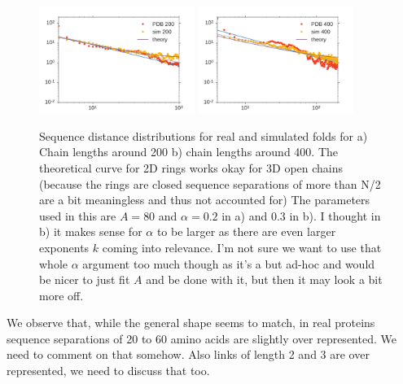 \documentclass[reprint,amsmath,amssymb,rmp,onecolumn,notitlepage,11pt]{revtex4-1}
\newcommand{\red}[1]{\textcolor{red!80!black}{#1}}
\begin{document}
\begin{figure}[h]
        \centering
	\includegraphics[width=0.45\textwidth]{figures/both_200.pdf}
	\includegraphics[width=0.45\textwidth]{figures/both_400.pdf}
        \caption{Sequence distance distributions for real and simulated folds for a) Chain lengths around 200 b) chain lengths around 400. The theoretical curve for 2D rings works okay for 3D open chains (because the rings are closed sequence separations of more than N/2 are a bit meaningless and thus not accounted for) The parameters used in this are $A=80$ and $\alpha=0.2$ in a) and $0.3$ in b). I thought in b) it makes sense for $\alpha$ to be larger as there are even larger exponents $k$ coming into relevance. I'm not sure we want to use that whole $\alpha$ argument too much though as it's a but ad-hoc and would be nicer to just fit $A$ and be done with it, but then it may look a bit more off.
        }
        \label{fig:time_scaling}
\end{figure}
\red{We observe that, while the general shape seems to match, in real proteins sequence separations of 20 to 60 amino acids are slightly over represented. We need to comment on that somehow. Also links of length 2 and 3 are over represented, we need to discuss that too.}
\end{document}
